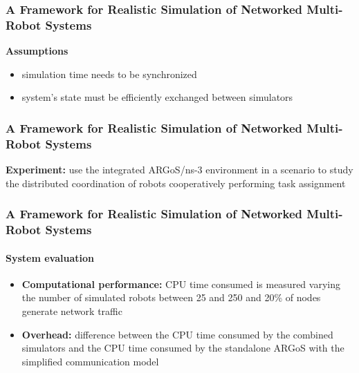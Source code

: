 \begin{frame}
	\frametitle{A Framework for Realistic Simulation of Networked Multi-Robot Systems}
	
	\textbf{Assumptions}
	
	\begin{itemize}
		\item simulation time needs to be synchronized
		
		\item system's state must be efficiently exchanged between simulators
	\end{itemize}
\end{frame}

\begin{frame}
	\frametitle{A Framework for Realistic Simulation of Networked Multi-Robot Systems}
	
	\textbf{Experiment:} use the integrated ARGoS/ns-3 environment in a scenario to study the distributed
	coordination of robots cooperatively performing task assignment
\end{frame}

\begin{frame}
	\frametitle{A Framework for Realistic Simulation of Networked Multi-Robot Systems}
	\framesubtitle{System evaluation}
	
	\begin{itemize}
		\item \textbf{Computational performance:} CPU time consumed is measured varying the number of simulated
			  robots between 25 and 250 and 20\% of nodes generate network traffic
		
		\vspace{0.3cm}
		
		\item \textbf{Overhead:} difference between the CPU time consumed by the combined simulators and the CPU time
			  consumed by the standalone ARGoS with the simplified communication model
	\end{itemize}
\end{frame}
